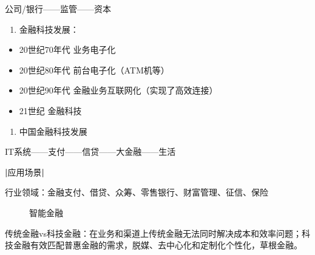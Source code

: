 \documentclass[letterpaper,10pt,english]{sphinxmanual}
\begin{document}
公司/银行——监管——资本
\begin{enumerate}
%
\setcounter{enumi}{1}
\item {} 
金融科技发展：

\end{enumerate}
\begin{itemize}
\item {} 
20世纪70年代 业务电子化

\item {} 
20世纪80年代 前台电子化（ATM机等）

\item {} 
20世纪90年代 金融业务互联网化（实现了高效连接）

\item {} 
21世纪 金融科技

\end{itemize}
\begin{enumerate}
%
\setcounter{enumi}{2}
\item {} 
中国金融科技发展

\end{enumerate}

IT系统——支付——信贷——大金融——生活

{\color{red}\bfseries{}|}应用场景{\color{red}\bfseries{}|}%
\begin{footnote}[1093]\sphinxAtStartFootnote
{}
%
\end{footnote}
行业领域：金融支付、借贷、众筹、零售银行、财富管理、征信、保险

\begin{figure}[H]
\centering
\capstart

\noindent{}
\caption{智能金融\sphinxfootnotemark[1094]}\label{\detokenize{chapter_AI+Finance/FinTech:id24}}\end{figure}
%
\begin{footnotetext}[1094]\sphinxAtStartFootnote
{}
%
\end{footnotetext}\ignorespaces 
传统金融vs科技金融：在业务和渠道上传统金融无法同时解决成本和效率问题；科技金融有效匹配普惠金融的需求，脱媒、去中心化和定制化个性化，草根金融。
\end{document}
